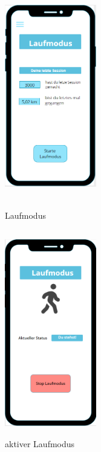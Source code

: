 \documentclass[a4paper,12pt]{article}
\begin{document}
\begin{figure}[ht!]
	\centering

	
		\begin{minipage}{0.4\textwidth}
			\includegraphics[width=4cm,height=9cm]{./Benutzeroberflaeche/Laufmodus.png}
			\caption{Laufmodus}
			\vspace{30px}
		\end{minipage}
			\hfill
		\begin{minipage}{0.4\textwidth}
			\includegraphics[width=4cm,height=9cm]{./Benutzeroberflaeche/Laufmodus_aktiv.png}
			\caption{aktiver Laufmodus}
			\vspace{30px}
		\end{minipage}
		\begin{minipage}{0.4\textwidth}

\end{minipage}
\end{figure}
\end{document}
